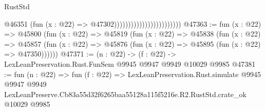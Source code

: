 \begin{lexlean}{RustStd}
\begin{coremodule}
                                                @46351
                                                  (fun (x : @22) => @47302))))))))))))))))))))))))
@47363 := fun (x : @22) =>
  @45800
    (fun (x : @22) =>
    @45819
      (fun (x : @22) =>
      @45838
        (fun (x : @22) =>
        @45857 (fun (x : @22) => @45876 (fun (x : @22) => @45895 (fun (x : @22) => @47350))))))
@47371 := (n : @22) -> (f : @22) -> LexLeanPreservation.Rust.FunSem @9945 @9947 @9949 @10029 @9985
@47381 := fun (n : @22) =>
  fun (f : @22) =>
  LexLeanPreservation.Rust.simulate
    @9945
    @9947
    @9949
    LexLeanPreserve.Cb83a55d32f6265baa55128a115f5216e.R2.RustStd.crate_ok
    @10029
    @9985
\end{coremodule}
\end{lexlean}
